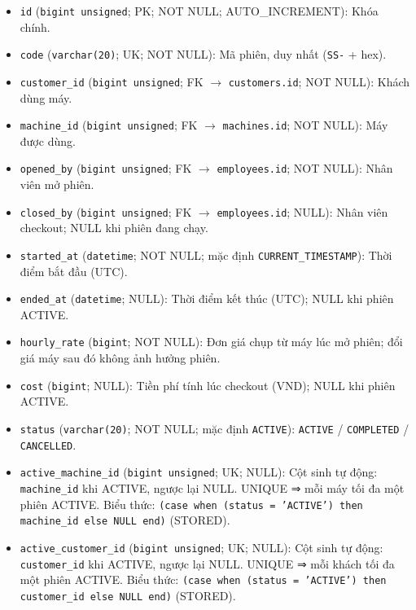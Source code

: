 \begin{itemize}

\item \texttt{id} (\texttt{bigint unsigned}; PK; NOT NULL; AUTO_INCREMENT): Khóa chính.

\item \texttt{code} (\texttt{varchar(20)}; UK; NOT NULL): Mã phiên, duy nhất (\texttt{SS-} + hex).

\item \texttt{customer\_id} (\texttt{bigint unsigned}; FK $\rightarrow$ \texttt{customers.id}; NOT NULL): Khách dùng máy.

\item \texttt{machine\_id} (\texttt{bigint unsigned}; FK $\rightarrow$ \texttt{machines.id}; NOT NULL): Máy được dùng.

\item \texttt{opened\_by} (\texttt{bigint unsigned}; FK $\rightarrow$ \texttt{employees.id}; NOT NULL): Nhân viên mở phiên.

\item \texttt{closed\_by} (\texttt{bigint unsigned}; FK $\rightarrow$ \texttt{employees.id}; NULL): Nhân viên checkout; NULL khi phiên đang chạy.

\item \texttt{started\_at} (\texttt{datetime}; NOT NULL; mặc định \texttt{CURRENT\_TIMESTAMP}): Thời điểm bắt đầu (UTC).

\item \texttt{ended\_at} (\texttt{datetime}; NULL): Thời điểm kết thúc (UTC); NULL khi phiên ACTIVE.

\item \texttt{hourly\_rate} (\texttt{bigint}; NOT NULL): Đơn giá chụp từ máy lúc mở phiên; đổi giá máy sau đó không ảnh hưởng phiên.

\item \texttt{cost} (\texttt{bigint}; NULL): Tiền phí tính lúc checkout (VND); NULL khi phiên ACTIVE.

\item \texttt{status} (\texttt{varchar(20)}; NOT NULL; mặc định \texttt{ACTIVE}): \texttt{ACTIVE} / \texttt{COMPLETED} / \texttt{CANCELLED}.

\item \texttt{active\_machine\_id} (\texttt{bigint unsigned}; UK; NULL): Cột sinh tự động: \texttt{machine\_id} khi ACTIVE, ngược lại NULL. UNIQUE ⇒ mỗi máy tối đa một phiên ACTIVE. Biểu thức: \texttt{(case when (status = 'ACTIVE') then machine\_id else NULL end)} (STORED).

\item \texttt{active\_customer\_id} (\texttt{bigint unsigned}; UK; NULL): Cột sinh tự động: \texttt{customer\_id} khi ACTIVE, ngược lại NULL. UNIQUE ⇒ mỗi khách tối đa một phiên ACTIVE. Biểu thức: \texttt{(case when (status = 'ACTIVE') then customer\_id else NULL end)} (STORED).

\end{itemize}

